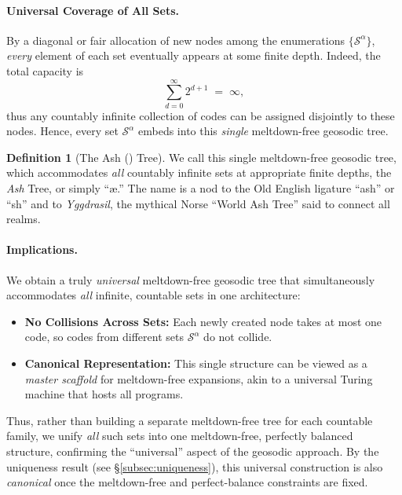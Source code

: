 \documentclass[11pt]{article}
\theoremstyle{definition}
\newtheorem{definition}[theorem]{Definition}
\theoremstyle{remark}
\begin{document}
\paragraph{Universal Coverage of All Sets.}
By a diagonal or fair allocation of new nodes among the enumerations $\{\mathcal{S}^\alpha\}$, 
\emph{every} element of each set eventually appears at some finite depth. 
Indeed, the total capacity is
\[
  \sum_{d=0}^{\infty} 2^{d+1} \;=\; \infty,
\]
thus any countably infinite collection of codes can be assigned disjointly to these nodes. 
Hence, every set $\mathcal{S}^\alpha$ embeds into this \emph{single} meltdown-free geosodic tree.

\begin{definition}[The Ash (\text{\ae}) Tree]
    \label{def:universal-ash}
    We call this single meltdown-free geosodic tree, which accommodates
    \emph{all} countably infinite sets at appropriate finite depths,
    the \emph{Ash} Tree, or simply ``\ae.'' The name is a nod to the 
    Old English ligature “ash” or “\text{\ae}sh” and to \emph{Yggdrasil}, 
    the mythical Norse ``World Ash Tree'' said to connect all realms.
    \end{definition}

\paragraph{Implications.}
We obtain a truly \emph{universal} meltdown-free geosodic tree 
that simultaneously accommodates \emph{all} infinite, countable sets in one architecture:
\begin{itemize}
    \item \textbf{No Collisions Across Sets:} Each newly created node takes at most one code,
    so codes from different sets $\mathcal{S}^\alpha$ do not collide.
    \item \textbf{Canonical Representation:} This single structure 
    can be viewed as a \emph{master scaffold} for meltdown-free expansions, 
    akin to a universal Turing machine that hosts all programs.
\end{itemize}

Thus, rather than building a separate meltdown-free tree for each countable family, 
we unify \emph{all} such sets into one meltdown-free, perfectly balanced structure, 
confirming the “universal” aspect of the geosodic approach. By the uniqueness result (see \S\ref{subsec:uniqueness}), 
this universal construction is also \emph{canonical} once the meltdown-free and
perfect-balance constraints are fixed.
\end{document}

